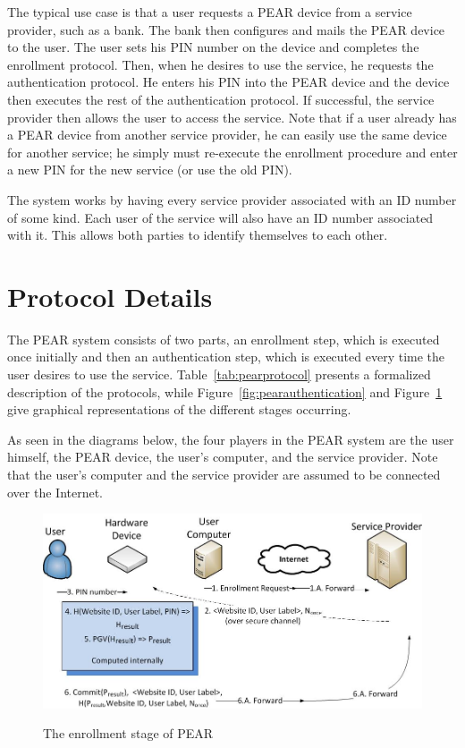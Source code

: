 The typical use case is that a user requests a PEAR device from a service provider, such as a bank. The bank then configures
and mails the PEAR device to the user. The user sets his PIN number on the device and completes the enrollment protocol.
Then, when he desires to use the service, he requests the authentication protocol. He enters his PIN into the PEAR device
and the device then executes the rest of the authentication protocol. If successful, the service provider then allows
the user to access the service. 
Note that if a user already has a PEAR device from another service provider, he can easily use the same device for another
service; he simply must re-execute the enrollment procedure and enter a new PIN for the new service (or use the old PIN).

The system works by having every service provider associated with an ID number of some kind. Each user of the service will
also have an ID number associated with it. This allows both parties to identify themselves to each other.

\section{Protocol Details}
The PEAR system consists of two parts, an enrollment step, which is executed once initially and then an authentication step,
which is executed every time the user desires to use the service.
Table~\ref{tab:pearprotocol} presents a formalized description of the protocols, while Figure~\ref{fig:pearauthentication}
and Figure~\ref{fig:pearenrollment} give graphical representations of the different stages occurring.

As seen in the diagrams below, the four players in the PEAR system are the user himself, the PEAR device, the user's computer,
and the service provider. Note that the user's computer and the service provider are assumed to be connected over the Internet.

\begin{figure}[!ht]
\includegraphics[width=500px]{images/enrollment.jpg}
\label{fig:pearenrollment}
\caption{The enrollment stage of PEAR}
\end{figure}
\FloatBarrier


